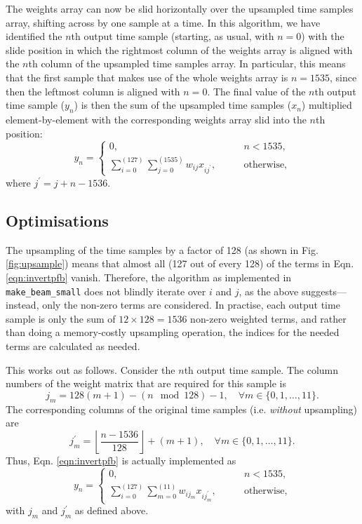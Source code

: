 \documentclass{article}
\begin{document}
The weights array can now be slid horizontally over the upsampled time samples array, shifting across by one sample at a time.
In this algorithm, we have identified the $n$th output time sample (starting, as usual, with $n = 0$) with the slide position in which the rightmost column of the weights array is aligned with the $n$th column of the upsampled time samples array.
In particular, this means that the first sample that makes use of the whole weights array is $n = 1535$, since then the leftmost column is aligned with $n = 0$.
The final value of the $n$th output time sample ($y_n$) is then the sum of the upsampled time samples ($x_n$) multiplied element-by-element with the corresponding weights array slid into the $n$th position:
\begin{equation}
    y_n = \begin{cases}
        0, &\qquad n < 1535, \\[5pt]
              \sum\limits_{i=0}^{(127)} \sum\limits_{j=0}^{(1535)} w_{ij} x_{ij^\prime}, &\qquad \text{otherwise,}
          \end{cases}
    \label{eqn:invertpfb}
\end{equation}
where $j^\prime = j + n - 1536$.

\subsection{Optimisations}

The upsampling of the time samples by a factor of 128 (as shown in Fig. \ref{fig:upsample}) means that almost all (127 out of every 128) of the terms in Eqn. \eqref{eqn:invertpfb} vanish.
Therefore, the algorithm as implemented in \texttt{make\_beam\_small} does not blindly iterate over $i$ and $j$, as the above suggests---instead, only the non-zero terms are considered.
In practise, each output time sample is only the sum of $12 \times 128 = 1536$ non-zero weighted terms, and rather than doing a memory-costly upsampling operation, the indices for the needed terms are calculated as needed.

This works out as follows.
Consider the $n$th output time sample.
The column numbers of the weight matrix that are required for this sample is
\begin{equation}
    j_m = 128(m+1) - (n \mod 128) - 1, \quad \forall m \in \{0,1,\dots,11\}.
\end{equation}
The corresponding columns of the original time samples (i.e. \emph{without} upsampling) are
\begin{equation}
    j_m^\prime = \left\lfloor \frac{n - 1536}{128} \right\rfloor + (m+1), \quad \forall m \in \{0,1,\dots,11\}.
\end{equation}
Thus, Eqn. \eqref{eqn:invertpfb} is actually implemented as
\begin{equation}
    y_n = \begin{cases}
        0, &\qquad n < 1535, \\[5pt]
              \sum\limits_{i=0}^{(127)} \sum\limits_{m=0}^{(11)} w_{ij_m} x_{ij_m^\prime}, &\qquad \text{otherwise,}
          \end{cases}
    \label{eqn:invertpfb_optimised}
\end{equation}
with $j_m$ and $j^\prime_m$ as defined above.
\end{document}
